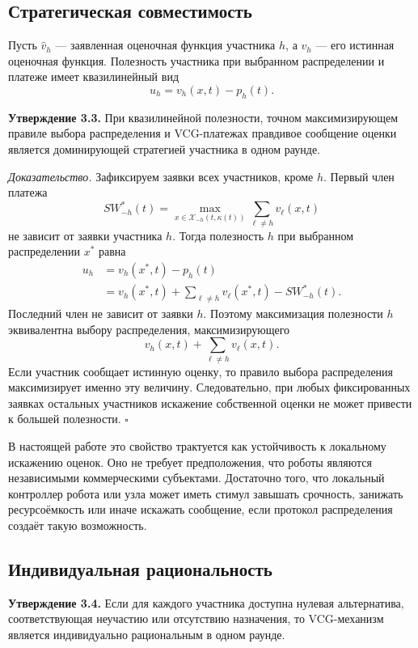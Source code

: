 \subsection{Стратегическая совместимость}

Пусть $\widehat{v}_h$ --- заявленная оценочная функция участника $h$, а $v_h$ --- его истинная оценочная функция. Полезность участника при выбранном распределении и платеже имеет квазилинейный вид
\begin{equation}
u_h=v_h(x,t)-p_h(t).
\label{eq:ch3_quasilinear_utility}
\end{equation}

\textbf{Утверждение 3.3.} При квазилинейной полезности, точном максимизирующем правиле выбора распределения и VCG-платежах правдивое сообщение оценки является доминирующей стратегией участника в одном раунде.

\textit{Доказательство.}
Зафиксируем заявки всех участников, кроме $h$. Первый член платежа
\[
SW^*_{-h}(t)=
\max_{x\in\mathcal{X}_{-h}(t,\kappa(t))}
\sum_{\ell\neq h}v_{\ell}(x,t)
\]
не зависит от заявки участника $h$. Тогда полезность $h$ при выбранном распределении $x^*$ равна
\[
\begin{aligned}
 u_h &= v_h(x^*,t)-p_h(t) \\
 &=v_h(x^*,t)+\sum_{\ell\neq h}v_{\ell}(x^*,t)-SW^*_{-h}(t).
\end{aligned}
\]
Последний член не зависит от заявки $h$. Поэтому максимизация полезности $h$ эквивалентна выбору распределения, максимизирующего
\[
v_h(x,t)+\sum_{\ell\neq h}v_{\ell}(x,t).
\]
Если участник сообщает истинную оценку, то правило выбора распределения максимизирует именно эту величину. Следовательно, при любых фиксированных заявках остальных участников искажение собственной оценки не может привести к большей полезности. \hfill$\square$

В настоящей работе это свойство трактуется как устойчивость к локальному искажению оценок. Оно не требует предположения, что роботы являются независимыми коммерческими субъектами. Достаточно того, что локальный контроллер робота или узла может иметь стимул завышать срочность, занижать ресурсоёмкость или иначе искажать сообщение, если протокол распределения создаёт такую возможность.

\subsection{Индивидуальная рациональность}

\textbf{Утверждение 3.4.} Если для каждого участника доступна нулевая альтернатива, соответствующая неучастию или отсутствию назначения, то VCG-механизм является индивидуально рациональным в одном раунде.

